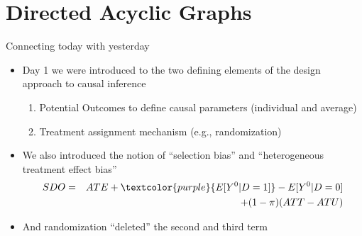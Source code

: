 
\section{Directed Acyclic Graphs}

\begin{frame}{Connecting today with yesterday}

\begin{itemize}
\item Day 1 we were introduced to the two defining elements of the design approach to causal inference
	\begin{enumerate}
	\item Potential Outcomes to define causal parameters (individual and average)
	\item Treatment assignment mechanism (e.g., randomization)
	\end{enumerate}
\item We also introduced the notion of ``selection bias'' and ``heterogeneous treatment effect bias''
\begin{eqnarray*}
SDO &=& ATE + \textcolor{purple}{E[Y^0|D=1]} - E[Y^0|D=0] \\
&& + (1-\pi)(ATT-ATU)
\end{eqnarray*}
\item And randomization ``deleted'' the second and third term
\end{itemize}

\end{frame}

